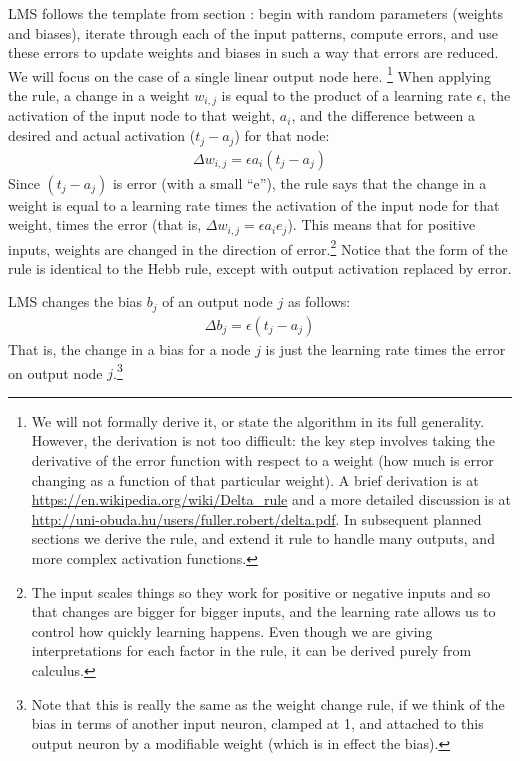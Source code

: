 LMS follows the template from section : begin with random parameters (weights and biases), iterate through each of the input patterns, compute errors, and use these errors to update weights and biases in such a way that errors are reduced. We will focus on the case of a single linear output node here. \footnote{We will not formally derive it, or state the algorithm in its full generality. However, the derivation is not too difficult: the key step involves taking the derivative of the error function with respect to a weight (how much is error changing as a function of that particular weight). A brief derivation is at \url{https://en.wikipedia.org/wiki/Delta_rule} and a more detailed discussion is at \url{http://uni-obuda.hu/users/fuller.robert/delta.pdf}. In subsequent planned sections we derive the rule, and extend it rule to handle many outputs, and more complex activation functions.} When applying the rule, a change in a weight $w_{i,j}$ is equal to the product of a learning rate $\epsilon$, the activation of the input node to that weight, $a_i$, and the difference between a desired and actual activation ($t_j - a_j$) for that node:
\begin{eqnarray*}
\Delta w_{i,j}  =  \epsilon a_i (t_j - a_j)
\end{eqnarray*}
Since $(t_j - a_j)$ is error  (with a small ``e''), the rule says that the change in a weight is equal to a learning rate times the activation of the input node for that weight, times the error (that is, $\Delta w_{i,j}  =  \epsilon a_i e_j$).  This means that for positive inputs, weights are changed in the direction of error.\footnote{The input scales things so they work for positive or negative inputs and so that changes are bigger for bigger inputs, and the learning rate allows us to control how quickly learning happens. Even though we are giving interpretations for each factor in the rule, it can be derived purely from calculus.} Notice that the form of the rule is identical to the Hebb rule, except with output activation replaced by error. 

LMS changes the bias $b_j$ of an output node $j$ as follows: 
\begin{eqnarray*}
\Delta b_j  =  \epsilon (t_j - a_j)
\end{eqnarray*}
That is, the change in a bias for a node $j$ is just the learning rate times the error on output node $j$.\footnote{Note that this is really the same as the weight change rule, if we think of the bias in terms of another input neuron, clamped at 1, and attached to this output neuron by a modifiable weight (which is in effect the bias).}

